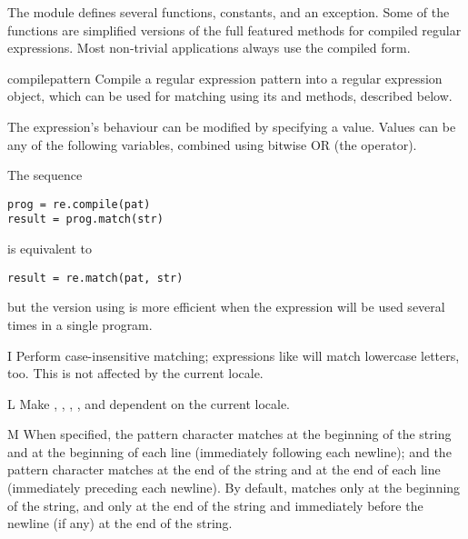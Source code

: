 The module defines several functions, constants, and an exception. Some of the
functions are simplified versions of the full featured methods for compiled
regular expressions.  Most non-trivial applications always use the compiled
form.

\begin{funcdesc}{compile}{pattern}
  Compile a regular expression pattern into a regular expression
  object, which can be used for matching using its  and
   methods, described below.

  The expression's behaviour can be modified by specifying a
   value.  Values can be any of the following variables,
  combined using bitwise OR (the \code{|} operator).

The sequence

\begin{verbatim}
prog = re.compile(pat)
result = prog.match(str)
\end{verbatim}

is equivalent to

\begin{verbatim}
result = re.match(pat, str)
\end{verbatim}

but the version using  is more efficient when the
expression will be used several times in a single program.
\end{funcdesc}

\begin{datadesc}{I}
Perform case-insensitive matching; expressions like \regexp{[A-Z]}
will match lowercase letters, too.  This is not affected by the
current locale.
\end{datadesc}

\begin{datadesc}{L}
Make , , , ,
 and  dependent on the current locale.
\end{datadesc}

\begin{datadesc}{M}
When specified, the pattern character \character{\textasciicircum}
matches at the beginning of the string and at the beginning of each
line (immediately following each newline); and the pattern character
\character{\$} matches at the end of the string and at the end of each
line (immediately preceding each newline).  By default,
\character{\textasciicircum} matches only at the beginning of the
string, and \character{\$} only at the end of the string and
immediately before the newline (if any) at the end of the string.
\end{datadesc}

